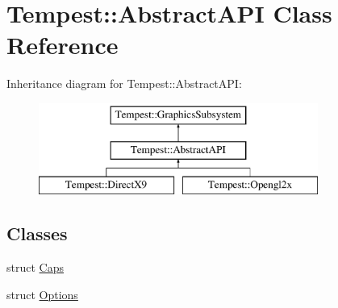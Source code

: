 \hypertarget{class_tempest_1_1_abstract_a_p_i}{\section{Tempest\+:\+:Abstract\+A\+P\+I Class Reference}
\label{class_tempest_1_1_abstract_a_p_i}
}
Inheritance diagram for Tempest\+:\+:Abstract\+A\+P\+I\+:\begin{figure}[H]
\begin{center}
\leavevmode
\includegraphics[height=3.000000cm]{class_tempest_1_1_abstract_a_p_i}
\end{center}
\end{figure}
\subsection*{Classes}
\begin{DoxyCompactItemize}
\item 
struct \hyperlink{struct_tempest_1_1_abstract_a_p_i_1_1_caps}{Caps}
\item 
struct \hyperlink{struct_tempest_1_1_abstract_a_p_i_1_1_options}{Options}
\end{DoxyCompactItemize}
